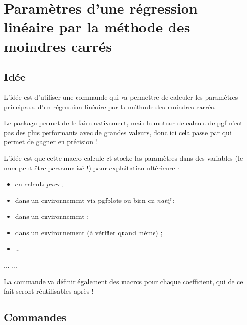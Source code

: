 \documentclass{article}
\newcommand\ctex[1]{\tcbox[vignettelatex]{#1}}
\begin{document}
\newpage

\section{Paramètres d'une régression linéaire par la méthode des moindres carrés}

\subsection{Idée}

\begin{codeidee}
L'idée est d'utiliser une commande qui va permettre de calculer les paramètres principaux d'un régression linéaire par la méthode des moindres carrés.

Le package \ctex{pgfpots} permet de le faire nativement, mais le moteur de calculs de \textsf{pgf} n'est pas des plus performants avec de grandes valeurs, donc ici cela passe par \ctex{xfp} qui permet de gagner en précision !

\smallskip

L'idée est que cette macro calcule et stocke les paramètres dans des variables (le nom peut être personnalisé !) pour exploitation ultérieure :

\begin{itemize}
	\item en calculs \textit{purs} ;
	\item dans un environnement \TikZ{} via \textsf{pgfplots} ou bien en \textit{natif} ;
	\item dans un environnement \PSTricks{} ;
	\item dans un environnement \METAPOST{} (à vérifier quand même) ;
	\item \ldots
\end{itemize}
\end{codeidee}

\begin{codetex}
...
...
\end{codetex}

\begin{codeinfo}
La commande \ctex{PLreglin} va définir également des \textsf{macros} pour chaque coefficient, qui de ce fait seront réutilisables après !
\end{codeinfo}

\subsection{Commandes}
\end{document}
